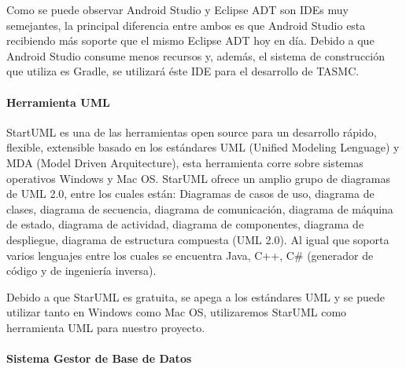 Como se puede observar Android Studio y Eclipse ADT son IDEs muy semejantes, la principal diferencia entre ambos es que Android Studio esta recibiendo más soporte que el mismo Eclipse ADT hoy en día. Debido a que Android Studio consume menos recursos y, además, el sistema de construcción que utiliza es Gradle, se utilizará éste IDE para el desarrollo de TASMC.

\paragraph{Herramienta UML}

StartUML es una de las herramientas open source para un desarrollo rápido, flexible, extensible basado en los estándares UML (Unified Modeling Lenguage) y MDA (Model Driven Arquitecture), esta herramienta corre sobre sistemas operativos Windows y Mac OS. StarUML ofrece un amplio grupo de diagramas de UML 2.0, entre los cuales están: Diagramas de casos de uso, diagrama de clases, diagrama de secuencia, diagrama de comunicación, diagrama de máquina de estado, diagrama de actividad, diagrama de componentes, diagrama de despliegue, diagrama de estructura compuesta (UML 2.0). Al igual que soporta varios lenguajes entre los cuales se encuentra Java, C++, C\# (generador de código y de ingeniería inversa). \cite{starUML}

Debido a que StarUML es gratuita, se apega a los estándares UML y se puede utilizar tanto en Windows como Mac OS, utilizaremos StarUML como herramienta UML para nuestro proyecto.
\newpage
\paragraph{Sistema Gestor de Base de Datos}

